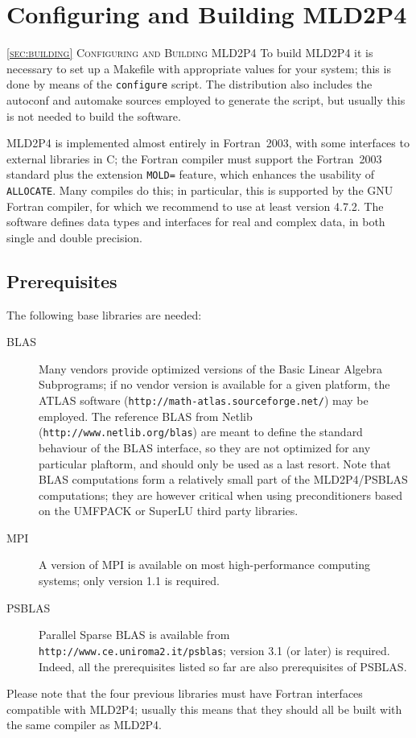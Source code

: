 \section{Configuring and Building MLD2P4\label{sec:building}}
         {\textsc{\ref{sec:building} Configuring and Building MLD2P4}}
To build MLD2P4 it is necessary to set up a Makefile with appropriate
values for your system; this is done by means of the \verb|configure|
script. The distribution also includes the autoconf and automake
sources employed to generate the script, but usually this is not needed
to build the software. 

MLD2P4 is implemented almost entirely in Fortran~2003, with some
interfaces to external libraries in C; the Fortran compiler
must support the Fortran~2003 standard plus the extension \verb|MOLD=|
feature, which
enhances the usability of \verb|ALLOCATE|. 
Many compiles do this; in particular, this is
supported by the GNU Fortran compiler, for which we 
recommend to use at least version 4.7.2. 
The software defines data types and interfaces for
real and complex data, in both single and double precision. 

\subsection{Prerequisites}

The following base libraries are needed: 
\begin{description}
\item[BLAS] \cite{blas3,blas2,blas1} Many vendors provide optimized versions
  of the Basic Linear Algebra Subprograms; if no vendor version is
  available for a given platform, the ATLAS software
  (\verb!http://math-atlas.sourceforge.net/!)
  may be employed.  The reference BLAS from Netlib
  (\verb|http://www.netlib.org/blas|) are meant to define the standard
  behaviour of the BLAS interface, so they are not optimized for any
  particular plaftorm, and should only be used as a last
  resort. Note that BLAS computations form a relatively small part of
  the MLD2P4/PSBLAS computations; they are however critical when using
  preconditioners based on the UMFPACK or SuperLU third party
  libraries.  
\item[MPI] \cite{MPI2,MPI1} A version of MPI is available on most
  high-performance computing systems; only version 1.1 is required.
 \item[PSBLAS] \cite{PSBLASGUIDE,psblas_00} Parallel Sparse BLAS is
  available from \\ \verb|http://www.ce.uniroma2.it/psblas|; version
  3.1   (or later) is required. Indeed, all the prerequisites
  listed so far are also prerequisites of PSBLAS.
\end{description}
Please note that the four previous libraries must have Fortran
interfaces compatible with MLD2P4;
usually this means that they should all be built with the same
compiler as MLD2P4.

